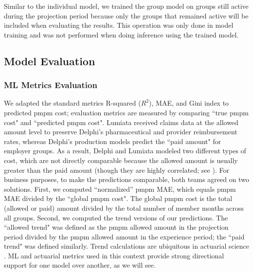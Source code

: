\documentclass[letterpaper]{article} %
\begin{document}
Similar to the individual model, we trained the group model on groups still active during the projection period because only the groups that remained active will be included when evaluating the results. This operation was only done in model training and was not performed when doing inference using the trained model.




\subsection{Model Evaluation}


\subsubsection{ML Metrics Evaluation}
We adapted the standard metrics R-squared ($R^{2}$), MAE, and Gini index \cite{gini} to predicted pmpm cost; evaluation metrics are measured by comparing ``true pmpm cost" and ``predicted pmpm cost". Lumiata received claims data at the allowed amount level to preserve Delphi's pharmaceutical and provider reimbursement rates, whereas Delphi's production models predict the ``paid amount" for employer groups. As a result, Delphi and Lumiata modeled two different types of cost, which are not directly comparable because the allowed amount is usually greater than the paid amount (though they are highly correlated; see \citeauthor{AccRisk} \citeyear{AccRisk}). For business purposes, to make the predictions comparable, both teams agreed on two solutions. First, we computed ``normalized'' pmpm MAE, which equals pmpm MAE divided by the ``global pmpm cost". The global pmpm cost is the total (allowed or paid) amount divided by the total number of member months across all groups.  Second, we computed the trend versions of our predictions. The ``allowed trend" was defined as the pmpm allowed amount in the projection period divided by the pmpm allowed amount in the experience period; the ``paid trend" was defined similarly.  Trend calculations are ubiquitous in actuarial science \cite{SOATrend}.  ML and actuarial metrics used in this context provide strong directional support for one model over another, as we will see.
\end{document}
